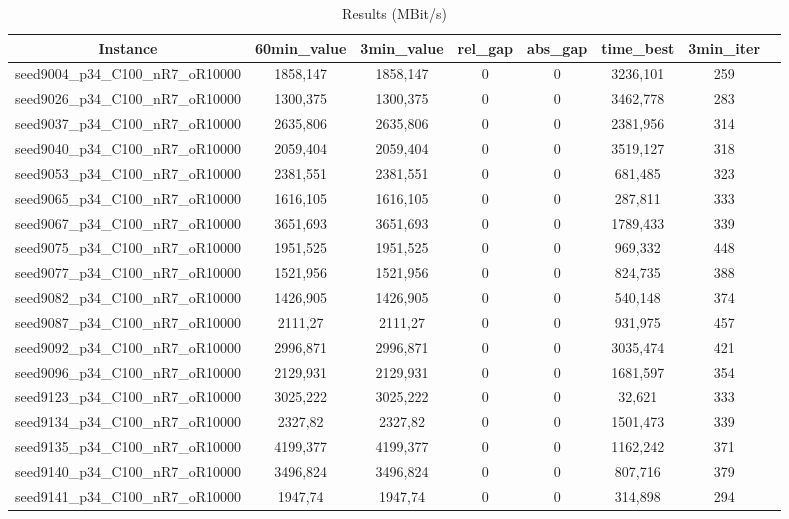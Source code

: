 \documentclass[a4paper]{article}
\begin{document}
\begin{center}
\begin{longtable}{cccccccc}
\caption{Results (MBit/s) }
\tabularnewline
\hline
Instance & 60min\_value & 3min\_value & rel\_gap & abs\_gap & time\_best & 3min\_iter\\
\hline
seed9004\_p34\_C100\_nR7\_oR10000 & 1858,147 & 1858,147 & 0 & 0 & 3236,101 & 259\\
\hline
seed9026\_p34\_C100\_nR7\_oR10000 & 1300,375 & 1300,375 & 0 & 0 & 3462,778 & 283\\
\hline
seed9037\_p34\_C100\_nR7\_oR10000 & 2635,806 & 2635,806 & 0 & 0 & 2381,956 & 314\\
\hline
seed9040\_p34\_C100\_nR7\_oR10000 & 2059,404 & 2059,404 & 0 & 0 & 3519,127 & 318\\
\hline
seed9053\_p34\_C100\_nR7\_oR10000 & 2381,551 & 2381,551 & 0 & 0 & 681,485 & 323\\
\hline
seed9065\_p34\_C100\_nR7\_oR10000 & 1616,105 & 1616,105 & 0 & 0 & 287,811 & 333\\
\hline
seed9067\_p34\_C100\_nR7\_oR10000 & 3651,693 & 3651,693 & 0 & 0 & 1789,433 & 339\\
\hline
seed9075\_p34\_C100\_nR7\_oR10000 & 1951,525 & 1951,525 & 0 & 0 & 969,332 & 448\\
\hline
seed9077\_p34\_C100\_nR7\_oR10000 & 1521,956 & 1521,956 & 0 & 0 & 824,735 & 388\\
\hline
seed9082\_p34\_C100\_nR7\_oR10000 & 1426,905 & 1426,905 & 0 & 0 & 540,148 & 374\\
\hline
seed9087\_p34\_C100\_nR7\_oR10000 & 2111,27 & 2111,27 & 0 & 0 & 931,975 & 457\\
\hline
seed9092\_p34\_C100\_nR7\_oR10000 & 2996,871 & 2996,871 & 0 & 0 & 3035,474 & 421\\
\hline
seed9096\_p34\_C100\_nR7\_oR10000 & 2129,931 & 2129,931 & 0 & 0 & 1681,597 & 354\\
\hline
seed9123\_p34\_C100\_nR7\_oR10000 & 3025,222 & 3025,222 & 0 & 0 & 32,621 & 333\\
\hline
seed9134\_p34\_C100\_nR7\_oR10000 & 2327,82 & 2327,82 & 0 & 0 & 1501,473 & 339\\
\hline
seed9135\_p34\_C100\_nR7\_oR10000 & 4199,377 & 4199,377 & 0 & 0 & 1162,242 & 371\\
\hline
seed9140\_p34\_C100\_nR7\_oR10000 & 3496,824 & 3496,824 & 0 & 0 & 807,716 & 379\\
\hline
seed9141\_p34\_C100\_nR7\_oR10000 & 1947,74 & 1947,74 & 0 & 0 & 314,898 & 294\\

\end{longtable}
\end{center}
\end{document}

